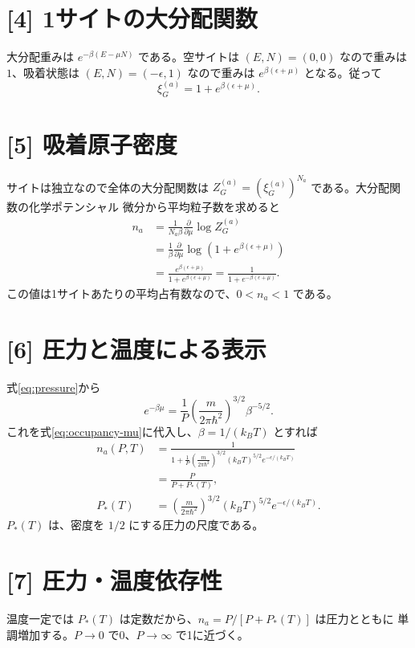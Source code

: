 \documentclass[11pt,a4paper]{article}
\begin{document}
\section*{[4] 1サイトの大分配関数}
大分配重みは $e^{-\beta(E-\mu N)}$ である。空サイトは $(E,N)=(0,0)$
なので重みは $1$、吸着状態は $(E,N)=(-\epsilon,1)$ なので重みは
$e^{\beta(\epsilon+\mu)}$ となる。従って
\begin{equation}
 \xi_G^{(a)}=1+e^{\beta(\epsilon+\mu)}.
 \label{eq:site-partition}
\end{equation}

\section*{[5] 吸着原子密度}
サイトは独立なので全体の大分配関数は
$Z_G^{(a)}=(\xi_G^{(a)})^{N_a}$ である。大分配関数の化学ポテンシャル
微分から平均粒子数を求めると
\begin{align}
 n_a
 &=\frac{1}{N_a\beta}\frac{\partial}{\partial\mu}
             \log Z_G^{(a)}\\
 &=\frac{1}{\beta}\frac{\partial}{\partial\mu}
             \log\!\left(1+e^{\beta(\epsilon+\mu)}\right)\\
 &=\frac{e^{\beta(\epsilon+\mu)}}{1+e^{\beta(\epsilon+\mu)}}
 =\frac{1}{1+e^{-\beta(\epsilon+\mu)}}.
 \label{eq:occupancy-mu}
\end{align}
この値は1サイトあたりの平均占有数なので、$0<n_a<1$ である。

\section*{[6] 圧力と温度による表示}
式\eqref{eq:pressure}から
\begin{equation}
 e^{-\beta\mu}
 =\frac{1}{P}\left(\frac{m}{2\pi\hbar^2}\right)^{3/2}
                  \beta^{-5/2}.
\end{equation}
これを式\eqref{eq:occupancy-mu}に代入し、$\beta=1/(k_BT)$ とすれば
\begin{align}
 n_a(P,T)
 &=\frac{1}{1+\displaystyle\frac{1}{P}
       \left(\frac{m}{2\pi\hbar^2}\right)^{3/2}
       (k_BT)^{5/2}e^{-\epsilon/(k_BT)}}\\
 &=\frac{P}{P+P_*(T)},\\
 P_*(T)&=\left(\frac{m}{2\pi\hbar^2}\right)^{3/2}
       (k_BT)^{5/2}e^{-\epsilon/(k_BT)}.
 \label{eq:occupancy-PT}
\end{align}
$P_*(T)$ は、密度を $1/2$ にする圧力の尺度である。

\section*{[7] 圧力・温度依存性}
温度一定では $P_*(T)$ は定数だから、$n_a=P/[P+P_*(T)]$ は圧力とともに
単調増加する。$P\to0$ で0、$P\to\infty$ で1に近づく。
\end{document}
